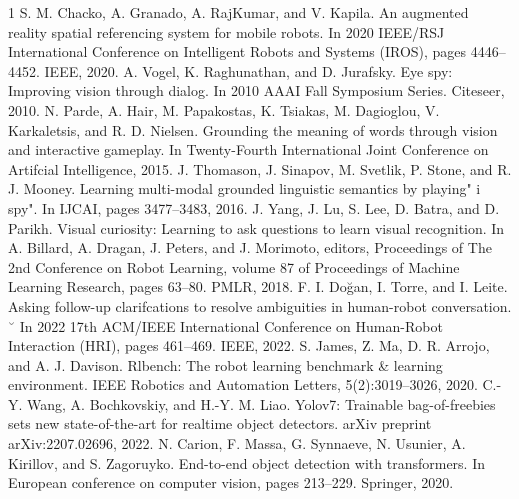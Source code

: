 \documentclass[journal]{IEEEtran}
\begin{document}
\begin{thebibliography}{1}
   S. M. Chacko, A. Granado, A. RajKumar, and V. Kapila. An augmented reality spatial referencing system for mobile
  robots. In 2020 IEEE/RSJ International Conference on Intelligent Robots and Systems (IROS), pages 4446–4452. IEEE,
  2020.
   A. Vogel, K. Raghunathan, and D. Jurafsky. Eye spy: Improving vision through dialog. In 2010 AAAI Fall Symposium
  Series. Citeseer, 2010.
   N. Parde, A. Hair, M. Papakostas, K. Tsiakas, M. Dagioglou, V. Karkaletsis, and R. D. Nielsen. Grounding the meaning of words through vision and interactive gameplay. In Twenty-Fourth International Joint Conference on Artifcial
  Intelligence, 2015.
   J. Thomason, J. Sinapov, M. Svetlik, P. Stone, and R. J. Mooney. Learning multi-modal grounded linguistic semantics
  by playing" i spy". In IJCAI, pages 3477–3483, 2016.
   J. Yang, J. Lu, S. Lee, D. Batra, and D. Parikh. Visual curiosity: Learning to ask questions to learn visual recognition.
  In A. Billard, A. Dragan, J. Peters, and J. Morimoto, editors, Proceedings of The 2nd Conference on Robot Learning,
  volume 87 of Proceedings of Machine Learning Research, pages 63–80. PMLR, 2018.
   F. I. Do\u{g}an, I. Torre, and I. Leite. Asking follow-up clarifcations to resolve ambiguities in human-robot conversation. ˘
  In 2022 17th ACM/IEEE International Conference on Human-Robot Interaction (HRI), pages 461–469. IEEE, 2022.
   S. James, Z. Ma, D. R. Arrojo, and A. J. Davison. Rlbench: The robot learning benchmark \& learning environment.
  IEEE Robotics and Automation Letters, 5(2):3019–3026, 2020.
   C.-Y. Wang, A. Bochkovskiy, and H.-Y. M. Liao. Yolov7: Trainable bag-of-freebies sets new state-of-the-art for realtime object detectors. arXiv preprint arXiv:2207.02696, 2022.
   N. Carion, F. Massa, G. Synnaeve, N. Usunier, A. Kirillov, and S. Zagoruyko. End-to-end object detection with transformers. In European conference on computer vision, pages 213–229. Springer, 2020.
  
\end{thebibliography}

% 
\end{document}
